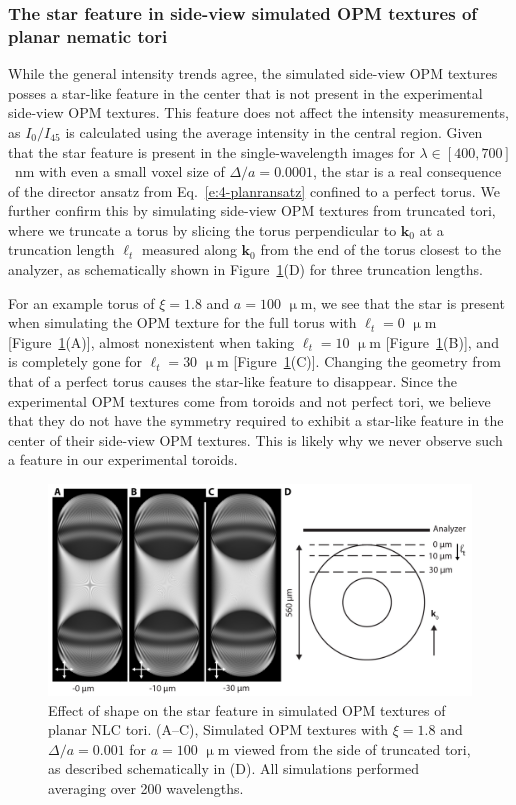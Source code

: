 \subsubsection{The star feature in side-view simulated OPM textures of planar nematic tori}
While the general intensity trends agree, the simulated side-view OPM textures posses a star-like feature in the center that is not present in the experimental side-view OPM textures.
This feature does not affect the intensity measurements, as $I_0/I_{45}$ is calculated using the average intensity in the central region.
Given that the star feature is present in the single-wavelength images for $\lambda \in [400,700]$~nm with even a small voxel size of $\Delta/a = 0.0001$, the star is a real consequence of the director ansatz from Eq.~\ref{e:4-planransatz} confined to a perfect torus.
We further confirm this by simulating side-view OPM textures from truncated tori, where we truncate a torus by slicing the torus perpendicular to $\mathbf{k}_0$ at a truncation length $\ell_t$ measured along $\mathbf{k}_0$ from the end of the torus closest to the analyzer, as schematically shown in Figure~\ref{f:4-nostar}(D) for three truncation lengths.

For an example torus of $\xi=1.8$ and $a = 100$ $\upmu$m, we see that the star is present when simulating the OPM texture for the full torus with $\ell_t=0$ $\upmu$m [Figure~\ref{f:4-nostar}(A)], almost nonexistent when taking $\ell_t=10$ $\upmu$m [Figure~\ref{f:4-nostar}(B)], and is completely gone for $\ell_t=30$ $\upmu$m [Figure~\ref{f:4-nostar}(C)].
Changing the geometry from that of a perfect torus causes the star-like feature to disappear.
Since the experimental OPM textures come from toroids and not perfect tori, we believe that they do not have the symmetry required to exhibit a star-like feature in the center of their side-view OPM textures.
This is likely why we never observe such a feature in our experimental toroids.
\begin{figure}
\centering
\includegraphics{figures/C4/Ch4-Figs_SimStarShape.png}
\caption{Effect of shape on the star feature in simulated OPM textures of planar NLC tori.
(A--C), Simulated OPM textures with $\xi = 1.8$ and $\Delta /a = 0.001$ for $a = 100$ $\upmu$m viewed from the side of truncated tori, as described schematically in (D).
All simulations performed averaging over 200 wavelengths.}\label{f:4-nostar}
\end{figure}


